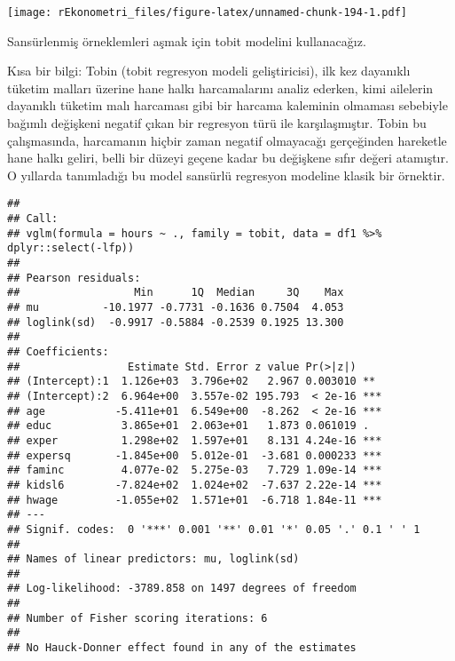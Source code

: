 \documentclass[
]{book}
\newenvironment{Shaded}{\begin{snugshade}}{\end{snugshade}}
\newcommand{\DataTypeTok}[1]{\textcolor[rgb]{0.13,0.29,0.53}{#1}}
\newcommand{\KeywordTok}[1]{\textcolor[rgb]{0.13,0.29,0.53}{\textbf{#1}}}
\newcommand{\NormalTok}[1]{#1}
\newcommand{\OperatorTok}[1]{\textcolor[rgb]{0.81,0.36,0.00}{\textbf{#1}}}
\newcommand{\StringTok}[1]{\textcolor[rgb]{0.31,0.60,0.02}{#1}}
\begin{document}
\texttt{[image: rEkonometri\_files/figure-latex/unnamed-chunk-194-1.pdf]}

Sansürlenmiş örneklemleri aşmak için tobit modelini kullanacağız.

Kısa bir bilgi: Tobin (tobit regresyon modeli geliştiricisi), ilk kez dayanıklı tüketim malları üzerine hane halkı harcamalarını analiz ederken, kimi ailelerin dayanıklı tüketim malı harcaması gibi bir harcama kaleminin olmaması sebebiyle bağımlı değişkeni negatif çıkan bir regresyon türü ile karşılaşmıştır. Tobin bu çalışmasında, harcamanın hiçbir zaman negatif olmayacağı gerçeğinden hareketle hane halkı geliri, belli bir düzeyi geçene kadar bu değişkene sıfır değeri atamıştır. O yıllarda tanımladığı bu model sansürlü regresyon modeline klasik bir örnektir.

\begin{Shaded}
\end{Shaded}

\begin{verbatim}
## 
## Call:
## vglm(formula = hours ~ ., family = tobit, data = df1 %>% dplyr::select(-lfp))
## 
## Pearson residuals:
##                  Min      1Q  Median     3Q    Max
## mu          -10.1977 -0.7731 -0.1636 0.7504  4.053
## loglink(sd)  -0.9917 -0.5884 -0.2539 0.1925 13.300
## 
## Coefficients: 
##                 Estimate Std. Error z value Pr(>|z|)    
## (Intercept):1  1.126e+03  3.796e+02   2.967 0.003010 ** 
## (Intercept):2  6.964e+00  3.557e-02 195.793  < 2e-16 ***
## age           -5.411e+01  6.549e+00  -8.262  < 2e-16 ***
## educ           3.865e+01  2.063e+01   1.873 0.061019 .  
## exper          1.298e+02  1.597e+01   8.131 4.24e-16 ***
## expersq       -1.845e+00  5.012e-01  -3.681 0.000233 ***
## faminc         4.077e-02  5.275e-03   7.729 1.09e-14 ***
## kidsl6        -7.824e+02  1.024e+02  -7.637 2.22e-14 ***
## hwage         -1.055e+02  1.571e+01  -6.718 1.84e-11 ***
## ---
## Signif. codes:  0 '***' 0.001 '**' 0.01 '*' 0.05 '.' 0.1 ' ' 1
## 
## Names of linear predictors: mu, loglink(sd)
## 
## Log-likelihood: -3789.858 on 1497 degrees of freedom
## 
## Number of Fisher scoring iterations: 6 
## 
## No Hauck-Donner effect found in any of the estimates
\end{verbatim}
\end{document}
